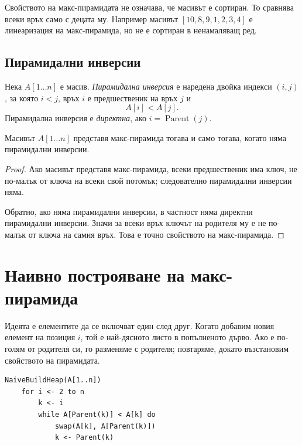 \begin{remark}
Свойството на макс-пирамидата не означава, че масивът е сортиран. То сравнява всеки връх само с децата му. Например масивът $[10,8,9,1,2,3,4]$ е линеаризация на макс-пирамида, но не е сортиран в ненамаляващ ред.
\end{remark}

\subsection{Пирамидални инверсии}\label{s:6.2.2}

\begin{defn}
Нека $A[1\ldots n]$ е масив. \emph{Пирамидална инверсия} е наредена двойка индекси $(i,j)$, за която $i<j$, връх $i$ е предшественик на връх $j$ и
\[
A[i]<A[j].
\]
Пирамидална инверсия е \emph{директна}, ако $i=\operatorname{Parent}(j)$.
\end{defn}

\begin{prop}
Масивът $A[1\ldots n]$ представя макс-пирамида тогава и само тогава, когато няма пирамидални инверсии.
\end{prop}

\begin{proof}
Ако масивът представя макс-пирамида, всеки предшественик има ключ, не по-малък от ключа на всеки свой потомък; следователно пирамидални инверсии няма.

Обратно, ако няма пирамидални инверсии, в частност няма директни пирамидални инверсии. Значи за всеки връх ключът на родителя му е не по-малък от ключа на самия връх. Това е точно свойството на макс-пирамида.
\end{proof}

\section{Наивно построяване на макс-пирамида}\label{s:6.3}

Идеята е елементите да се включват един след друг. Когато добавим новия елемент на позиция $i$, той е най-дясното листо в попълненото дърво. Ако е по-голям от родителя си, го разменяме с родителя; повтаряме, докато възстановим свойството на пирамидата.

\begin{verbatim}
NaiveBuildHeap(A[1..n])
    for i <- 2 to n
        k <- i
        while A[Parent(k)] < A[k] do
            swap(A[k], A[Parent(k)])
            k <- Parent(k)
\end{verbatim}


